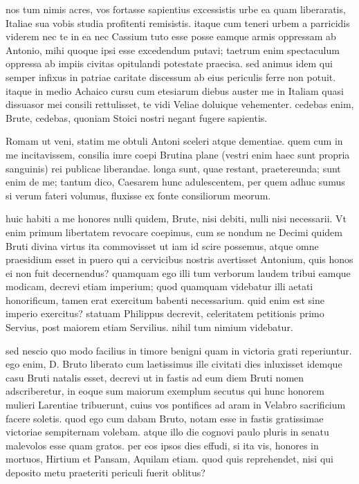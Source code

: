  nos tum nimis acres, vos fortasse sapientius excessistis urbe ea quam liberaratis, Italiae sua vobis studia profitenti remisistis. itaque cum teneri urbem a parricidis viderem nec te in ea nec Cassium tuto esse posse eamque armis oppressam ab Antonio, mihi quoque ipsi esse excedendum putavi; taetrum enim spectaculum oppressa ab impiis civitas opitulandi potestate praecisa. sed animus idem qui semper infixus in patriae caritate discessum ab eius periculis ferre non potuit. itaque in medio Achaico cursu cum etesiarum diebus auster me in Italiam quasi dissuasor mei consili rettulisset, te vidi Veliae doluique vehementer. cedebas enim, Brute, cedebas, quoniam Stoici nostri negant fugere sapientis.

 Romam ut veni, statim me obtuli Antoni sceleri atque dementiae. quem cum in me incitavissem, consilia imre coepi Brutina plane (vestri enim haec sunt propria sanguinis) rei publicae liberandae. longa sunt, quae restant, praetereunda; sunt enim de me; tantum dico, Caesarem hunc adulescentem, per quem adhuc sumus si verum fateri volumus, fluxisse ex fonte consiliorum meorum.

 huic habiti a me honores nulli quidem, Brute, nisi debiti, nulli nisi necessarii. Vt enim primum libertatem revocare coepimus, cum se nondum ne Decimi quidem Bruti divina virtus ita commovisset ut iam id scire possemus, atque omne praesidium esset in puero qui a cervicibus nostris avertisset Antonium, quis honos ei non fuit decernendus? quamquam ego illi tum verborum laudem tribui eamque modicam, decrevi etiam imperium; quod quamquam videbatur illi aetati honorificum, tamen erat exercitum babenti necessarium. quid enim est sine imperio exercitus? statuam Philippus decrevit, celeritatem petitionis primo Servius, post maiorem etiam Servilius. nihil tum nimium videbatur.

 sed nescio quo modo facilius in timore benigni quam in victoria grati reperiuntur. ego enim, D. Bruto liberato cum laetissimus ille civitati dies inluxisset idemque casu Bruti natalis esset, decrevi ut in fastis ad eum diem Bruti nomen adscriberetur, in eoque sum maiorum exemplum secutus qui hunc honorem mulieri Larentiae tribuerunt, cuius vos pontifices ad aram in Velabro sacrificium facere soletis. quod ego cum dabam Bruto, notam esse in fastis gratissimae victoriae sempiternam volebam. atque illo die cognovi paulo pluris in senatu malevolos esse quam gratos. per eos ipsos dies effudi, si ita vis, honores in mortuos, Hirtium et Pansam, Aquilam etiam. quod quis reprehendet, nisi qui deposito metu praeteriti periculi fuerit oblitus?

